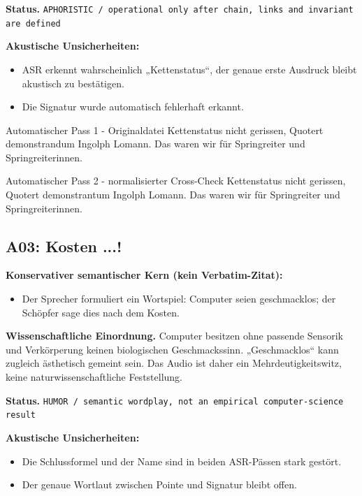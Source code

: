\documentclass[11pt,a4paper]{article}
\newcommand{\status}[1]{\texttt{#1}}
\begin{document}
\textbf{Status.} \status{APHORISTIC / operational only after chain, links and invariant are defined}

\textbf{Akustische Unsicherheiten:}
\begin{itemize}
\item ASR erkennt wahrscheinlich „Kettenstatus“, der genaue erste Ausdruck bleibt akustisch zu bestätigen.
\item Die Signatur wurde automatisch fehlerhaft erkannt.
\end{itemize}

\begin{asrbox}{Automatischer Pass 1 - Originaldatei}
Kettenstatus nicht gerissen, Quotert demonstrandum Ingolph Lomann. Das waren wir für Springreiter und Springreiterinnen.
\end{asrbox}

\begin{asrbox}{Automatischer Pass 2 - normalisierter Cross-Check}
Kettenstatus nicht gerissen, Quotert demonstrantum Ingolph Lomann. Das waren wir für Springreiter und Springreiterinnen.
\end{asrbox}


\subsection{A03: Kosten ...!}
\label{sec:a03}
\textbf{Konservativer semantischer Kern (kein Verbatim-Zitat):}
\begin{itemize}
\item Der Sprecher formuliert ein Wortspiel: Computer seien geschmacklos; der Schöpfer sage dies nach dem Kosten.
\end{itemize}

\textbf{Wissenschaftliche Einordnung.} Computer besitzen ohne passende Sensorik und Verkörperung keinen biologischen Geschmackssinn. „Geschmacklos“ kann zugleich ästhetisch gemeint sein. Das Audio ist daher ein Mehrdeutigkeitswitz, keine naturwissenschaftliche Feststellung.

\textbf{Status.} \status{HUMOR / semantic wordplay, not an empirical computer-science result}

\textbf{Akustische Unsicherheiten:}
\begin{itemize}
\item Die Schlussformel und der Name sind in beiden ASR-Pässen stark gestört.
\item Der genaue Wortlaut zwischen Pointe und Signatur bleibt offen.
\end{itemize}
\end{document}
